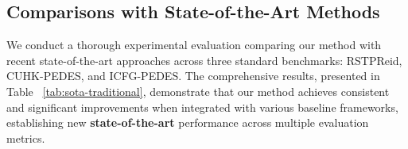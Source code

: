 \subsection{Comparisons with State-of-the-Art Methods}

We conduct a thorough experimental evaluation comparing our method with recent state-of-the-art approaches across three standard benchmarks: RSTPReid, CUHK-PEDES, and ICFG-PEDES. The comprehensive results, presented in Table ~\ref{tab:sota-traditional}, demonstrate that our method achieves consistent and significant improvements when integrated with various baseline frameworks, establishing new \textbf{state-of-the-art} performance across multiple evaluation metrics.







